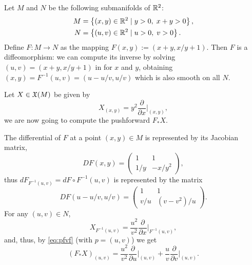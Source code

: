 \begin{example}
  Let $M$ and $N$ be the following submanifolds of $\mathbb{R}^2$:
  \begin{align}
    M &= \left\{(x,y)\in\mathbb{R}^2 \mid y>0,\; x+y>0\right\},\\
    N &= \left\{(u,v)\in\mathbb{R}^2 \mid u>0,\; v>0 \right\}.
  \end{align}
  Define $F:M\to N$ as the mapping $F(x,y):=(x+y, x/y+1)$.
  Then $F$ is a diffeomorphism: we can compute its inverse by solving $(u,v)=(x+y, x/y+1)$ in for $x$ and $y$, obtaining $(x,y)=F^{-1}(u,v)=(u-u/v, u/v)$ which is also smooth on all $N$.
  
  Let $X\in\mathfrak{X}(M)$ be given by
  \begin{equation}
    X_{(x,y)} = y^2\frac{\partial}{\partial x}\Big|_{(x,y)},
  \end{equation}
  we are now going to compute the pushforward $F_* X$.
  
  The differential of $F$ at a point $(x,y)\in M$ is represented by its Jacobian matrix,
  \begin{equation}
    DF(x,y) = \begin{pmatrix}
      1 & 1\\
      1/y & -x/y^2
    \end{pmatrix},
  \end{equation}
  thus $dF_{F^{-1}(u,v)} = dF\circ F^{-1}(u,v)$ is represented by the matrix
  \begin{equation}
    DF(u-u/v, u/v) = \begin{pmatrix}
      1 & 1\\
      v/u & (v-v^2)/u
    \end{pmatrix}.
  \end{equation}
  For any $(u,v)\in N$,
  \begin{equation}
    X_{F^{-1}(u,v)} = \frac{u^2}{v^2}\frac{\partial}{\partial x}\Big|_{F^{-1}(u,v)},
  \end{equation}
  and, thus, by \eqref{eq:pfvf} (with $p=(u,v)$) we get
  \begin{equation}
    (F_*X)_{(u,v)} = \frac{u^2}{v^2}\frac{\partial}{\partial u}\Big|_{(u,v)} + \frac{u}{v}\frac{\partial}{\partial v}\Big|_{(u,v)}.
  \end{equation}
\end{example}

